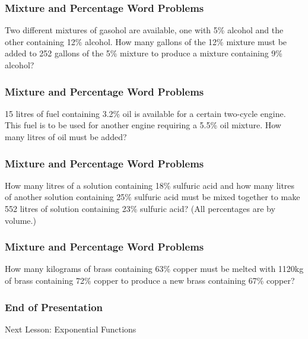 \documentclass[xcolor=dvipsnames]{beamer}
\begin{document}
\begin{frame}
  \frametitle{Mixture and Percentage Word Problems}
{\ubung} Two different mixtures of gasohol are available,
one with 5\% alcohol and the other containing 12\% alcohol. How many
gallons of the 12\% mixture must be added to 252 gallons of the 5\%
mixture to produce a mixture containing 9\% alcohol?
\end{frame}

\begin{frame}
  \frametitle{Mixture and Percentage Word Problems}
{\ubung} 15 litres of fuel containing 3.2\% oil is
  available for a certain two-cycle engine. This fuel is to be used
  for another engine requiring a 5.5\% oil mixture. How many litres of
  oil must be added?
\end{frame}

\begin{frame}
  \frametitle{Mixture and Percentage Word Problems}
{\ubung} How many litres of a solution containing 18\%
  sulfuric acid and how many litres of another solution containing
  25\% sulfuric acid must be mixed together to make 552 litres of
  solution containing 23\% sulfuric acid? (All percentages are by
  volume.)
\end{frame}

\begin{frame}
  \frametitle{Mixture and Percentage Word Problems}
  {\ubung} How many kilograms of brass containing 63\% copper must be
  melted with 1120kg of brass containing 72\% copper to produce a new
  brass containing 67\% copper?
\end{frame}

\begin{frame}
  \frametitle{End of Presentation}
Next Lesson: Exponential Functions
\end{frame}
\end{document}
